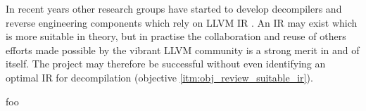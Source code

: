 
In recent years other research groups have started to develop decompilers and reverse engineering components which rely on LLVM IR \cite{decomp_llvm,retargetable_decomp,mcsema}. An IR may exist which is more suitable in theory, but in practise the collaboration and reuse of others efforts made possible by the vibrant LLVM community is a strong merit in and of itself. The project may therefore be successful without even identifying an optimal IR for decompilation (objective \ref{itm:obj_review_suitable_ir}).

foo
